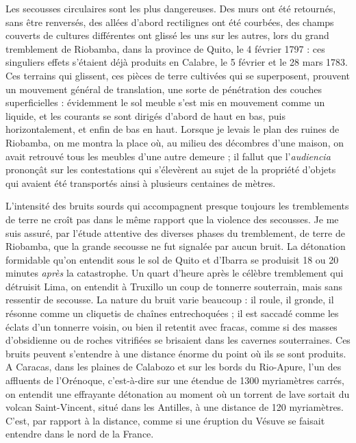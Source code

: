 \documentclass[a4paper, 11pt, oneside, landscape]{article}
\begin{document}
Les secousses circulaires sont les plus dangereuses. Des murs ont été retournés, sans être renversés, des allées d'abord rectilignes ont été courbées, des champs couverts de cultures différentes ont glissé les uns sur les autres, lors du grand tremblement de Riobamba, dans la province de Quito, le 4 février 1797 : ces singuliers effets s'étaient déjà produits en Calabre, le 5 février et le 28 mars 1783. Ces terrains qui glissent, ces pièces de terre cultivées qui se superposent, prouvent un mouvement général de translation, une sorte de pénétration des couches superficielles : évidemment le sol meuble s'est mis en mouvement comme un liquide, et les courants se sont dirigés d'abord de haut en bas, puis horizontalement, et enfin de bas en haut. Lorsque je levais le plan des ruines de Riobamba, on me montra la place où, au milieu des décombres d'une maison, on avait retrouvé tous les meubles d'une autre demeure ; il fallut que l'\emph{audiencia} prononçât sur les contestations qui s'élevèrent au sujet de la propriété d'objets qui avaient été transportés ainsi à plusieurs centaines de mètres.

L'intensité des bruits sourds qui accompagnent presque toujours les tremblements de terre ne croît pas dans le même rapport que la violence des secousses. Je me suis assuré, par l'étude attentive des diverses phases du tremblement, de terre de Riobamba, que la grande secousse ne fut signalée par aucun bruit. La détonation formidable qu'on entendit sous le sol de Quito et d'Ibarra se produisit 18 ou 20 minutes \emph{après} la catastrophe. Un quart d'heure après le célèbre tremblement qui détruisit Lima, on entendit à Truxillo un coup de tonnerre souterrain, mais sans ressentir de secousse. La nature du bruit varie beaucoup : il roule, il gronde, il résonne comme un cliquetis de chaînes entrechoquées ; il est saccadé comme les éclats d'un tonnerre voisin, ou bien il retentit avec fracas, comme si des masses d'obsidienne ou de roches vitrifiées se brisaient dans les cavernes souterraines. Ces bruits peuvent s'entendre à une distance énorme du point où ils se sont produits. A Caracas, dans les plaines de Calabozo et sur les bords du Rio-Apure, l'un des affluents de l'Orénoque, c'est-à-dire sur une étendue de 1300 myriamètres carrés, on entendit une effrayante détonation au moment où un torrent de lave sortait du volcan Saint-Vincent, situé dans les Antilles, à une distance de 120 myriamètres. C'est, par rapport à la distance, comme si une éruption du Vésuve se faisait entendre dans le nord de la France.
\end{document}
